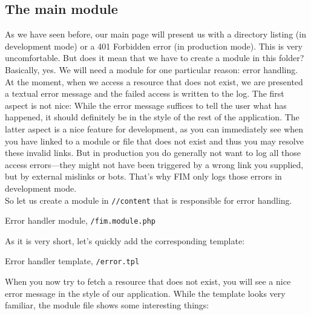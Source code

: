 \documentclass{scrartcl}
\begin{document}
   \subsection{The main module} \label{mainModule}
      As we have seen before, our main page will present us with a directory listing (in development mode) or a 401 Forbidden error (in production mode). This is very uncomfortable. But does it mean that we have to create a module in this folder? \\
      Basically, yes. We will need a module for one particular reason: error handling. At the moment, when we access a resource that does not exist, we are presented a textual error message and the failed access is written to the log. The first aspect is not nice: While the error message suffices to tell the user what has happened, it should definitely be in the style of the rest of the application. The latter aspect is a nice feature for development, as you can immediately see when you have linked to a module or file that does not exist and thus you may resolve these invalid links. But in production you do generally not want to log all those access errors---they might not have been triggered by a wrong link you supplied, but by external mislinks or bots. That's why FIM only logs those errors in development mode. \\
      So let us create a module in \texttt{//content} that is responsible for error handling.
      \begin{listing}[H]
         \caption{Error handler module, \texttt{/fim.module.php}}
      \end{listing}
      As it is very short, let's quickly add the corresponding template:
      \enlargethispage{.8cm}
      \begin{listing}[H]
         \caption{Error handler template, \texttt{/error.tpl}}
      \end{listing}
      When you now try to fetch a resource that does not exist, you will see a nice error message in the style of our application. While the template looks very familiar, the module file shows some interesting things:
\end{document}

